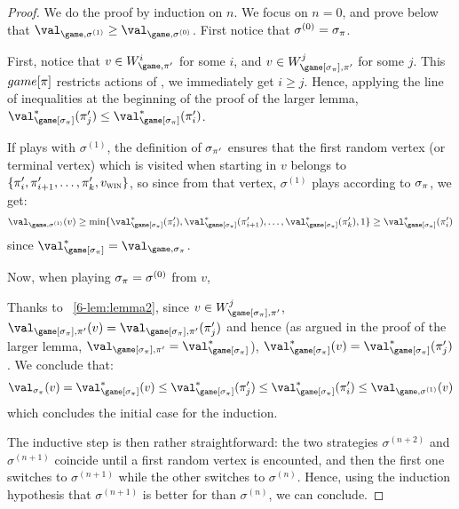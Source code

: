   \begin{proof}
    We do the proof by induction on $n$.  We focus on $n=0$, and prove
    below that $\val_{\game,\sigma^{(1)}} \ge
    \val_{\game,\sigma^{(0)}}$. First notice that $\sigma^{(0)} =
    \sigma_\pi$.

    First, notice that $v \in W_{\game,\perm'}^i$ for some $i$, and $v
    \in W_{\game[\sigma_\perm],\perm'}^j$ for some $j$. This
    $game[\pi]$ restricts actions of \Eve, we immediately get $i \ge
    j$. Hence, applying the line of inequalities at the beginning of
    the proof of the larger lemma,
    $\val^*_{\game[\sigma_\perm]}(\perm'_j) \le
    \val^*_{\game[\sigma_\perm]}(\perm'_i)$.

    If \Eve plays with $\sigma^{(1)}$, the definition of
    $\sigma_{\pi'}$ ensures that the first random vertex (or
    terminal vertex) which is visited when starting in $v$ belongs to
    $\{\pi'_i,\pi'_{i+1},\dots,\pi'_k,v_{\textsc{win}}\}$, so since from
    that vertex, $\sigma^{(1)}$ plays according to $\sigma_\pi$, we
    get:
    \[
    \val_{\game,\sigma^{(1)}}(v) \ge \min
    \{\val^*_{\game[\sigma_\perm]}(\perm'_i),
    \val^*_{\game[\sigma_\perm]}(\perm'_{i+1}),\dots,
    \val^*_{\game[\sigma_\perm]}(\perm'_k),1\} \ge
    \val^*_{\game[\sigma_\perm]}(\perm'_i)
    \]
    since $\val^*_{\game[\sigma_\perm]} = \val_{\game,\sigma_\perm}$.

    Now, when playing $\sigma_\pi = \sigma^{(0)}$ from $v$, 

    Thanks to ~\cref{6-lem:lemma2}, since $v \in
    W_{\game[\sigma_\perm],\perm'}^j$,
    $\val_{\game[\sigma_\perm],\perm'}(v) =
    \val_{\game[\sigma_\perm],\perm'}(\perm'_j)$ and hence (as argued
    in the proof of the larger lemma,
    $\val_{\game[\sigma_\perm],\perm'} =
    \val^*_{\game[\sigma_\perm]}$), $\val^*_{\game[\sigma_\perm]}(v) =
    \val^*_{\game[\sigma_\perm]}(\perm'_j)$. We conclude that:
    \[
    \val_{\sigma_\perm}(v) = \val^*_{\game[\sigma_\perm]}(v) \le
    \val^*_{\game[\sigma_\perm]}(\perm'_j) \le
    \val^*_{\game[\sigma_\perm]}(\perm'_i) \le
    \val_{\game,\sigma^{(1)}}(v)
    \]
    which concludes the initial case for the induction.

    \smallskip The inductive step is then rather straightforward: the
    two strategies $\sigma^{(n+2)}$ and $\sigma^{(n+1)}$ coincide
    until a first random vertex is encounted, and then the first one
    switches to $\sigma^{(n+1)}$ while the other switches to
    $\sigma^{(n)}$. Hence, using the induction hypothesis that
    $\sigma^{(n+1)}$ is better for \Eve than $\sigma^{(n)}$, we can
    conclude.
  \end{proof}

